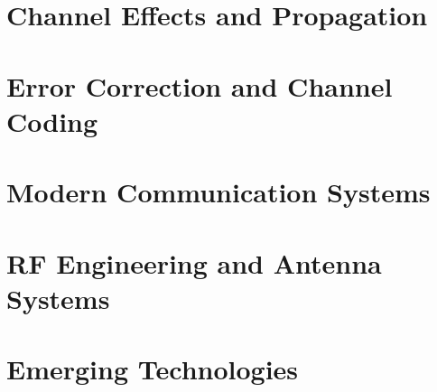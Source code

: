 \documentclass[11pt,twoside,openany]{book}
\begin{document}
\part{Channel Effects and Propagation}
% 
% 
% 
% 
% 
% 
% 
% 
% 

\part{Error Correction and Channel Coding}
% 
% 
% 
% 
% 
% 

\part{Modern Communication Systems}
% 
% 
% 
% 
% 
% 
% 

\part{RF Engineering and Antenna Systems}
% 

\part{Emerging Technologies}
% 
% 
\end{document}
